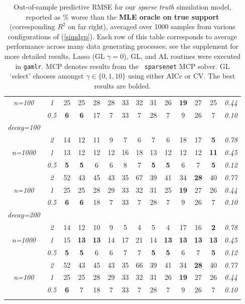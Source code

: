 \begin{table}
\begin{center}
\begin{tabular}{cc|cc|cc|cc|cc|cc|c|c}
\it n=100  & \it  1  & 25 & 25 & 28 & 28 & 33 & 32 & 31 & 26 & {\bf 19} & 27 & 25 & \it  0.44 \\
& \it  0.5  & {\bf 6} & {\bf 6} & 17 & 7 & 33 & 7 & 28 & 7 & 9 & 26 & 7 & \it  0.10 \\[1ex]
\hline\rule{0pt}{3ex}{\it decay=100} &&&&&&&&&&&&\\
& \it  2  & 14 & 12 & 11 & 9 & 7 & 6 & 7 & 6 & 18 & 17 & {\bf 5} & \it  0.78 \\
\it n=1000  & \it  1  & 13 & 12 & 12 & 12 & 16 & 18 & 13 & 12 & 12 & 12 & {\bf 11} & \it  0.45 \\
& \it  0.5  & {\bf 5} & {\bf 5} & 6 & 6 & 8 & 7 & {\bf 5} & {\bf 5} & 6 & 7 & {\bf 5} & \it  0.12 \\[1ex]
\cline{2-2}\rule{0pt}{3ex}& \it  2  & 52 & 43 & 45 & 43 & 35 & 67 & 39 & 41 & 34 & {\bf 28} & 40 & \it  0.77 \\
\it n=100  & \it  1  & 25 & 25 & 28 & 29 & 33 & 32 & 31 & 25 & {\bf 19} & 27 & 26 & \it  0.44 \\
& \it  0.5  & {\bf 6} & {\bf 6} & 18 & 7 & 33 & 7 & 28 & 7 & 9 & 26 & 7 & \it  0.10 \\[1ex]
\hline\rule{0pt}{3ex}{\it decay=200} &&&&&&&&&&&&\\
& \it  2  & 14 & 12 & 10 & 9 & 5 & 4 & 5 & 4 & 17 & 16 & {\bf 2} & \it  0.78 \\
\it n=1000  & \it  1  & 15 & {\bf 13} & {\bf 13} & 14 & 17 & 21 & 14 & {\bf 13} & {\bf 13} & {\bf 13} & {\bf 13} & \it  0.45 \\
& \it  0.5  & {\bf 5} & {\bf 5} & 6 & 6 & 7 & 7 & {\bf 5} & {\bf 5} & 6 & 7 & {\bf 5} & \it  0.12 \\[1ex]
\cline{2-2}\rule{0pt}{3ex}& \it  2  & 52 & 43 & 45 & 43 & 35 & 66 & 39 & 41 & 34 & {\bf 28} & 40 & \it  0.77 \\
\it n=100  & \it  1  & 25 & 25 & 28 & 29 & 33 & 32 & 31 & 26 & {\bf 19} & 27 & 26 & \it  0.44 \\
& \it  0.5  & {\bf 6} & 7 & 18 & 7 & 33 & 7 & 28 & 7 & 9 & 26 & 7 & \it  0.10 \\[1ex]
\hline\rule{0pt}{3ex}\end{tabular}
\end{center}
\vspace{-1cm}
\caption{\label{tab:simsparse} Out-of-sample predictive RMSE for our {\it sparse truth} simulation model, 
reported as  \%
worse than the {\bf MLE oracle on true support} (corresponding $R^2$ on far right), averaged over 1000  samples from
various configurations of (\ref{simdgp}).   
Each row of this table corresponds to average performance across many
data generating processes; see the supplement for more detailed results.  Lasso (GL $\gamma=0$), GL, and
AL routines were executed in {\tt gamlr}.  MCP denotes results from the {\tt
sparsenet} MCP solver. 
GL `select' chooses amongst $\gamma \in \{0,1,10\}$ using either AICc or CV.
The best results are bolded.}
\end{table}

